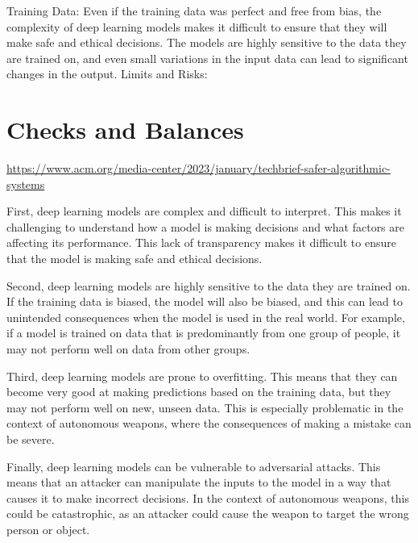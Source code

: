 Training Data: Even if the training data was perfect and free from bias, the complexity of deep learning models makes it difficult to ensure that they will make safe and ethical decisions. The models are highly sensitive to the data they are trained on, and even small variations in the input data can lead to significant changes in the output.
Limits and Risks:

\section{Checks and Balances}

\url{https://www.acm.org/media-center/2023/january/techbrief-safer-algorithmic-systems}

First, deep learning models are complex and difficult to interpret. This makes it challenging to understand how a model is making decisions and what factors are affecting its performance. This lack of transparency makes it difficult to ensure that the model is making safe and ethical decisions.

Second, deep learning models are highly sensitive to the data they are trained on. If the training data is biased, the model will also be biased, and this can lead to unintended consequences when the model is used in the real world. For example, if a model is trained on data that is predominantly from one group of people, it may not perform well on data from other groups.

Third, deep learning models are prone to overfitting. This means that they can become very good at making predictions based on the training data, but they may not perform well on new, unseen data. This is especially problematic in the context of autonomous weapons, where the consequences of making a mistake can be severe.

Finally, deep learning models can be vulnerable to adversarial attacks. This means that an attacker can manipulate the inputs to the model in a way that causes it to make incorrect decisions. In the context of autonomous weapons, this could be catastrophic, as an attacker could cause the weapon to target the wrong person or object.
